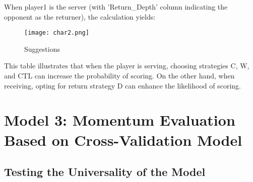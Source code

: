 \documentclass[12pt]{article}
\begin{document}
When player1 is the server (with 'Return\_Depth' column indicating the opponent as the returner), the calculation yields:

\begin{figure}[H]
	\centering
	\texttt{[image: char2.png]}
	\caption{Suggestions}\label{tb:char2}
\end{figure}

This table illustrates that when the player is serving, choosing strategies C, W, and CTL can increase the probability of scoring. On the other hand, when receiving, opting for return strategy D can enhance the likelihood of scoring.




\section{Model 3: Momentum Evaluation Based on Cross-Validation Model}

\subsection{Testing the Universality of the Model}
\end{document}
